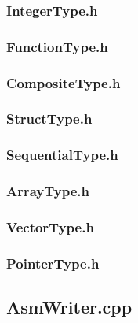 \documentclass{ctexart}
\begin{document}
\subsubsection{IntegerType.h}
\subsubsection{FunctionType.h}
\subsubsection{CompositeType.h}
\subsubsection{StructType.h}
\subsubsection{SequentialType.h}
\subsubsection{ArrayType.h}
\subsubsection{VectorType.h}
\subsubsection{PointerType.h}

\subsection{AsmWriter.cpp}
\par
{}
\end{document}
